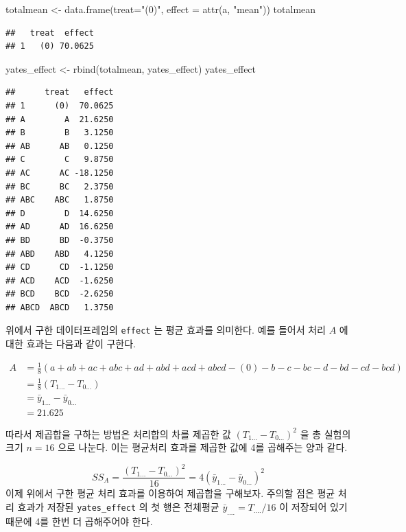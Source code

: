 \documentclass[
]{book}
\newenvironment{Shaded}{\begin{snugshade}}{\end{snugshade}}
\newcommand{\AttributeTok}[1]{\textcolor[rgb]{0.77,0.63,0.00}{#1}}
\newcommand{\FunctionTok}[1]{\textcolor[rgb]{0.00,0.00,0.00}{#1}}
\newcommand{\NormalTok}[1]{#1}
\newcommand{\OtherTok}[1]{\textcolor[rgb]{0.56,0.35,0.01}{#1}}
\newcommand{\StringTok}[1]{\textcolor[rgb]{0.31,0.60,0.02}{#1}}
\begin{document}
\begin{Shaded}
\begin{Highlighting}[]
\NormalTok{totalmean }\OtherTok{\textless{}{-}}  \FunctionTok{data.frame}\NormalTok{(}\AttributeTok{treat=}\StringTok{"(0)"}\NormalTok{, }\AttributeTok{effect =} \FunctionTok{attr}\NormalTok{(a, }\StringTok{"mean"}\NormalTok{))}
\NormalTok{totalmean }
\end{Highlighting}
\end{Shaded}

\begin{verbatim}
##   treat  effect
## 1   (0) 70.0625
\end{verbatim}

\begin{Shaded}
\begin{Highlighting}[]
\NormalTok{yates\_effect }\OtherTok{\textless{}{-}} \FunctionTok{rbind}\NormalTok{(totalmean, yates\_effect)}
\NormalTok{yates\_effect}
\end{Highlighting}
\end{Shaded}

\begin{verbatim}
##      treat   effect
## 1      (0)  70.0625
## A        A  21.6250
## B        B   3.1250
## AB      AB   0.1250
## C        C   9.8750
## AC      AC -18.1250
## BC      BC   2.3750
## ABC    ABC   1.8750
## D        D  14.6250
## AD      AD  16.6250
## BD      BD  -0.3750
## ABD    ABD   4.1250
## CD      CD  -1.1250
## ACD    ACD  -1.6250
## BCD    BCD  -2.6250
## ABCD  ABCD   1.3750
\end{verbatim}

위에서 구한 데이터프레임의 \texttt{effect} 는 평균 효과를 의미한다. 예를 들어서 처리 \(A\) 에 대한 효과는 다음과 같이
구한다.

\begin{align*}
A & = \frac{1}{8} (a + ab + ac + abc + ad + abd + acd + abcd - (0) - b -c -bc -d - bd - cd -bcd) \\
  & =\frac{1}{8} (T_{1...} - T_{0...}) \\
  & = \bar {y}_{1...} - \bar {y}_{0...} \\
  & = 21.625 
\end{align*}

따라서 제곱합을 구하는 방법은 처리합의 차를 제곱한 값 \((T_{1...} - T_{0...})^2\) 을 총 실험의 크기 \(n=16\) 으로 나눈다.
이는 평균처리 효과를 제곱한 값에 4를 곱해주는 양과 같다.

\[ SS_A =  \frac{(T_{1...} - T_{0...})^2}{16} = 4 (\bar {y}_{1...} - \bar {y}_{0...})^2  \]
이제 위에서 구한 평균 처리 효과를 이용하여 제곱합을 구해보자. 주의할 점은 평균 처리 효과가 저장된 \texttt{yates\_effect} 의 첫 행은 전체평균 \(\bar y_{....} = T_{....}/16\) 이 저장되어 있기 때문에 4를 한번 더 곱해주어야 한다.
\end{document}
